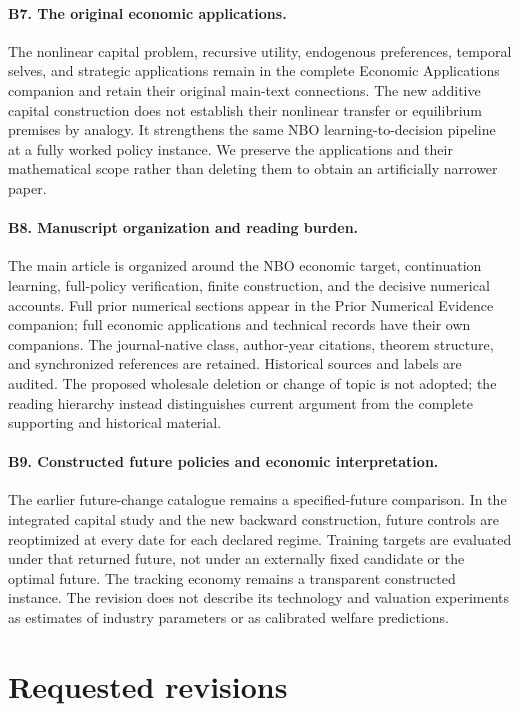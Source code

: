 \paragraph*{B7. The original economic applications.}
The nonlinear capital problem, recursive utility, endogenous preferences,
temporal selves, and strategic applications remain in the complete Economic
Applications companion and retain their original main-text connections. The
new additive capital construction does not establish their nonlinear
transfer or equilibrium premises by analogy. It strengthens the same NBO
learning-to-decision pipeline at a fully worked policy instance. We preserve
the applications and their mathematical scope rather than deleting them to
obtain an artificially narrower paper.

\paragraph*{B8. Manuscript organization and reading burden.}
The main article is organized around the NBO economic target, continuation
learning, full-policy verification, finite construction, and the decisive
numerical accounts. Full prior numerical sections appear in the Prior
Numerical Evidence companion; full economic applications and technical
records have their own companions. The journal-native class, author-year
citations, theorem structure, and synchronized references are retained.
Historical sources and labels are audited. The proposed wholesale deletion
or change of topic is not adopted; the reading hierarchy instead distinguishes
current argument from the complete supporting and historical material.

\paragraph*{B9. Constructed future policies and economic interpretation.}
The earlier future-change catalogue remains a specified-future comparison.
In the integrated capital study and the new backward construction, future
controls are reoptimized at every date for each declared regime. Training
targets are evaluated under that returned future, not under an externally
fixed candidate or the optimal future. The tracking economy remains a
transparent constructed instance. The revision does not describe its
technology and valuation experiments as estimates of industry parameters or
as calibrated welfare predictions.

\section*{Requested revisions}
